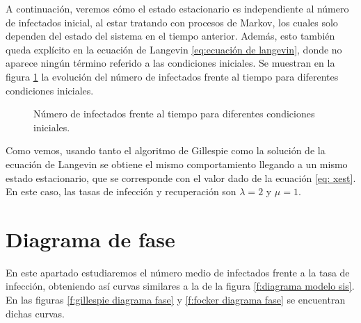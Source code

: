 A continuación, veremos cómo el estado estacionario es independiente al número de infectados inicial, al estar
tratando con procesos de Markov, los cuales solo dependen del estado del sistema en el tiempo anterior. Además, esto también
queda explícito en la ecuación de Langevin \ref{eq:ecuación de langevin}, donde no aparece ningún término referido a las condiciones iniciales.
Se muestran en la figura \ref{f:ccii} la evolución del número de infectados frente al tiempo para diferentes condiciones iniciales.



\begin{figure}[H]
    \begin{center}
      \begin{subfigure}
          [Gillespie.]{
          \texttt{[image: Ccii.png]}
          \label{f:gillespie ccii}}
      \end{subfigure}
  
      \vspace{0.5cm}
      
      \begin{subfigure}
          [Langevin.]{
          \texttt{[image: cciifockerplanck.png]}
          \label{f:focker ccii}}
      \end{subfigure}
      
      \caption{Número de infectados frente al tiempo para diferentes condiciones iniciales.}
      \label{f:ccii}
    \end{center}    
\end{figure}

Como vemos, usando tanto el algoritmo de Gillespie como la solución de la ecuación de Langevin se obtiene el mismo comportamiento llegando a un 
mismo estado estacionario, que se corresponde con el valor dado de la ecuación \ref{eq: xest}. En este caso, las tasas de infección y recuperación
son $\lambda=2$ y $\mu=1$.
\newpage
\section{Diagrama de fase}

En este apartado estudiaremos el número medio de infectados frente a la tasa de infección, obteniendo así curvas
similares a la de la figura \ref{f:diagrama modelo sis}. En las figuras \ref{f:gillespie diagrama fase} y \ref{f:focker diagrama fase}
se encuentran dichas curvas.


